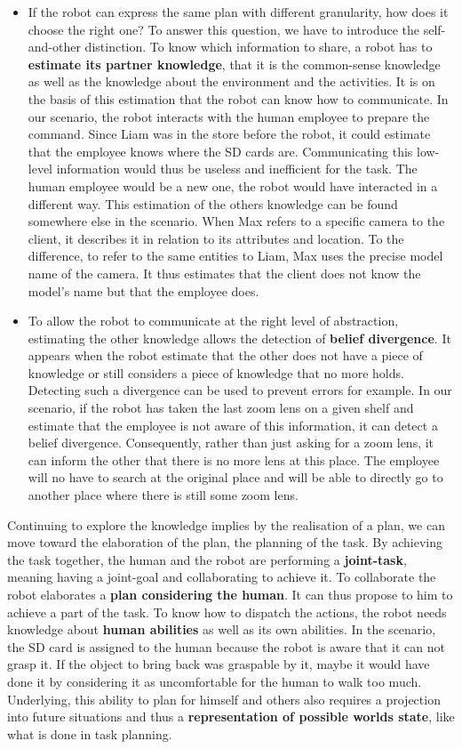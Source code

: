 \begin{itemize}
  \item If the robot can express the same plan with different granularity, how does it choose the right one? To answer this question, we have to introduce the self-and-other distinction. To know which information to share, a robot has to \textbf{estimate its partner knowledge}, that it is the common-sense knowledge as well as the knowledge about the environment and the activities. It is on the basis of this estimation that the robot can know how to communicate. In our scenario, the robot interacts with the human employee to prepare the command. Since Liam was in the store before the robot, it could estimate that the employee knows where the SD cards are. Communicating this low-level information would thus be useless and inefficient for the task. The human employee would be a new one, the robot would have interacted in a different way. This estimation of the others knowledge can be found somewhere else in the scenario. When Max refers to a specific camera to the client, it describes it in relation to its attributes and location. To the difference, to refer to the same entities to Liam, Max uses the precise model name of the camera. It thus estimates that the client does not know the model's name but that the employee does.
  
  \item To allow the robot to communicate at the right level of abstraction, estimating the other knowledge allows the detection of \textbf{belief divergence}. It appears when the robot estimate that the other does not have a piece of knowledge or still considers a piece of knowledge that no more holds. Detecting such a divergence can be used to prevent errors for example. In our scenario, if the robot has taken the last zoom lens on a given shelf and estimate that the employee is not aware of this information, it can detect a belief divergence. Consequently, rather than just asking for a zoom lens, it can inform the other that there is no more lens at this place. The employee will no have to search at the original place and will be able to directly go to another place where there is still some zoom lens.
\end{itemize}

Continuing to explore the knowledge implies by the realisation of a plan, we can move toward the elaboration of the plan, the planning of the task. By achieving the task together, the human and the robot are performing a \textbf{joint-task}, meaning having a joint-goal and collaborating to achieve it. To collaborate the robot elaborates a \textbf{plan considering the human}. It can thus propose to him to achieve a part of the task. To know how to dispatch the actions, the robot needs knowledge about \textbf{human abilities} as well as its own abilities. In the scenario, the SD card is assigned to the human because the robot is aware that it can not grasp it. If the object to bring back was graspable by it, maybe it would have done it by considering it as uncomfortable for the human to walk too much. Underlying, this ability to plan for himself and others also requires a projection into future situations and thus a \textbf{representation of possible worlds state}, like what is done in task planning.

